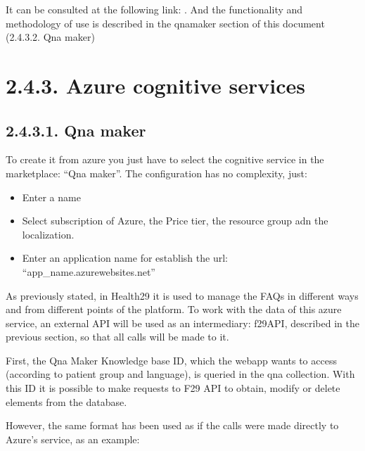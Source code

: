 \documentclass[letterpaper,10pt,english]{sphinxmanual}
\begin{document}
It can be consulted at the following link: .
And the functionality and methodology of use is described in the qnamaker section of this document (2.4.3.2. Qna maker)


\section{2.4.3. Azure cognitive services}
\label{\detokenize{pages/SW/Code:azure-cognitive-services}}

\subsection{2.4.3.1. Qna maker}
\label{\detokenize{pages/SW/Code:qna-maker}}
To create it from azure you just have to select the cognitive service in the marketplace: “Qna maker”.
The configuration has no complexity, just:
\begin{itemize}
\item {} 
Enter a name

\item {} 
Select subscription of Azure, the Price tier, the resource group adn the localization.

\item {} 
Enter an application name for establish the url: “app\_name.azurewebsites.net”

\end{itemize}

As previously stated, in Health29 it is used to manage the FAQs in different ways and from different points of the platform. To work with the data of this azure service, an external API will be used as an intermediary: f29API, described in the previous section, so that all calls will be made to it.



First, the Qna Maker Knowledge base ID, which the webapp wants to access (according to patient group and language), is queried in the qna collection.
With this ID it is possible to make requests to F29 API to obtain, modify or delete elements from the database.

However, the same format has been used as if the calls were made directly to Azure’s service, as an example:
\end{document}
